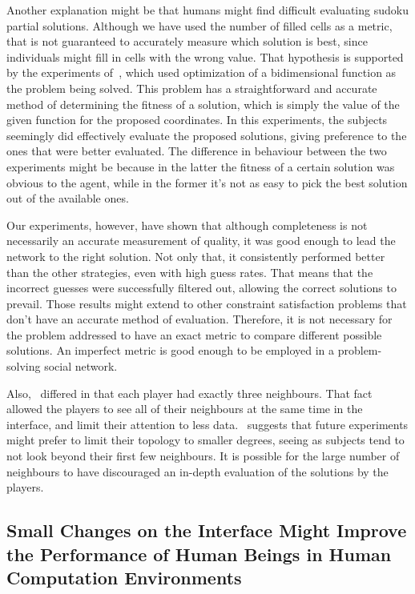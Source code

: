 \documentclass{article}
\begin{document}
Another explanation might be that humans might find difficult evaluating sudoku partial solutions. Although we have used the number of filled cells as a metric, that is not guaranteed to accurately measure which solution is best, since individuals might fill in cells with the wrong value. That hypothesis is supported by the experiments of~\cite{mason:collablearnet}, which used optimization of a bidimensional function as the problem being solved. This problem has a straightforward and accurate method of determining the fitness of a solution, which is simply the value of the given function for the proposed coordinates. In this experiments, the subjects seemingly did effectively evaluate the proposed solutions, giving preference to the ones that were better evaluated. The difference in behaviour between the two experiments might be because in the latter the fitness of a certain solution was obvious to the agent, while in the former it's not as easy to pick the best solution out of the available ones.

Our experiments, however, have shown that although completeness is not necessarily an accurate measurement of quality, it was good enough to lead the network to the right solution. Not only that, it consistently performed better than the other strategies, even with high guess rates.
That means that the incorrect guesses were successfully filtered out, allowing the correct solutions to prevail.
Those results might extend to other constraint satisfaction problems that don't have an accurate method of evaluation. Therefore, it is not necessary for the problem addressed to have an exact metric to compare different possible solutions. An imperfect metric is good enough to be employed in a problem-solving social network. 

Also,~\cite{mason:collablearnet} differed in that each player had exactly three neighbours. That fact allowed the players to see all of their neighbours at the same time in the interface, and limit their attention to less data.~\cite{farenzena:collabem} suggests that future experiments might prefer to limit their topology to smaller degrees, seeing as subjects tend to not look beyond their first few neighbours. It is possible for the large number of neighbours to have discouraged an in-depth evaluation of the solutions by the players.

\subsection{Small Changes on the Interface Might Improve the Performance of Human Beings in Human Computation Environments}
\end{document}
